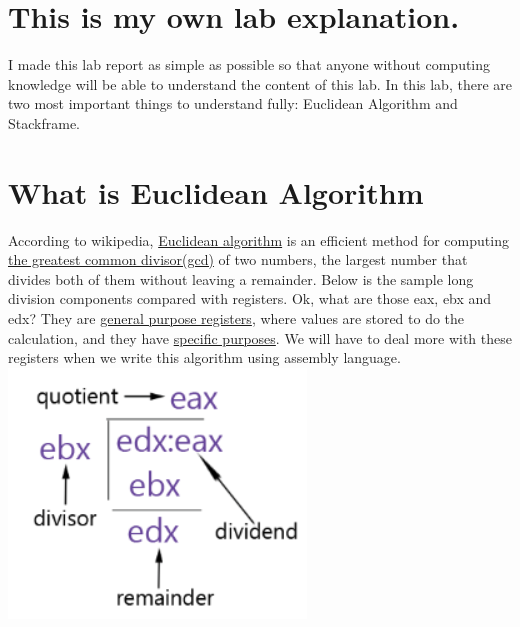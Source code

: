 \documentclass{article}
\begin{document}
\section*{This is my own lab explanation.}
I made this lab report as simple as possible so that anyone without computing knowledge will be able to understand the content of this lab. In this lab, there are two most important things to understand fully: Euclidean Algorithm and Stackframe. \\

\section*{What is Euclidean Algorithm}
According to wikipedia, \href{https://goo.gl/H3t3BI}{Euclidean algorithm} is an efficient method for computing \href{https://goo.gl/iKdLpd}{the greatest common divisor(gcd)} of two numbers, the largest number that divides both of them without leaving a remainder. Below is the sample long division components compared with registers. Ok, what are those eax, ebx and edx? They are \href{https://goo.gl/2So2Hx}{general purpose registers}, where values are stored to do the calculation, and they have \href{https://goo.gl/Nrc0GJ}{specific purposes}. We will have to deal more with these registers when we write this algorithm using assembly language.\\
\includegraphics[scale=0.4]{gcdsample.PNG}
\clearpage
\end{document}
